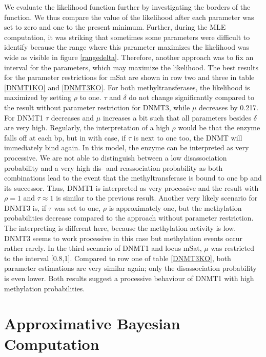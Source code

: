 We evaluate the likelihood function further by investigating the borders of the function. We thus compare the value of the likelihood after each parameter was set to zero and one to the present minimum. Further, during the \ac{MLE} computation, it was striking that sometimes some parameters were difficult to identify because the range where this parameter maximizes the likelihood was wide as visible in figure \ref{rangedelta}. Therefore, another approach was to fix an interval for the parameters, which may maximize the likelihood. The best results for the parameter restrictions for mSat are shown in row two and three in table \ref{DNMT1KO} and \ref{DNMT3KO}. For both methyltransferases, the likelihood is maximized by setting $\rho$ to one. $\tau$ and $\delta$ do not change significantly compared to the result without parameter restriction for DNMT3, while $\mu$ decreases by 0.217. For DNMT1 $\tau$ decreases and $\mu$ increases a bit such that all parameters besides $\delta$ are very high. Regularly, the interpretation of a high $\rho$ would be that the enzyme falls off at each \ac{bp}, but in with case, if $\tau$ is next to one too, the \ac{DNMT} will immediately bind again. In this model, the enzyme can be interpreted as very processive. We are not able to distinguish between a low disassociation probability and a very high dis- and reassociation probability as both combinations lead to the event that the methyltransferase is bound to one \ac{bp} and its successor. Thus, DNMT1 is interpreted as very processive and the result with $\rho=1$ and $\tau \approx 1$ is similar to the previous result. Another very likely scenario for DNMT3 is, if $\tau$ was set to one, $\rho$ is approximately one, but the methylation probabilities decrease compared to the approach without parameter restriction. The interpreting is different here, because the methylation activity is low. DNMT3 seems to work processive in this case but methylation events occur rather rarely. In the third scenario of DNMT1 and locus mSat, $\mu$ was restricted to the interval [0.8,1]. Compared to row one of table \ref{DNMT3KO}, both parameter estimations are very similar again; only the disassociation probability is even lower. Both results suggest a processive behaviour of DNMT1 with high methylation probabilities.\\




\section{Approximative Bayesian Computation}
\label{ABC}
